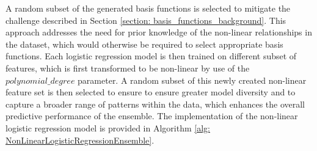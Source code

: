 \documentclass[10pt, conference]{IEEEtran}
\begin{document}
A random subset of the generated basis functions is selected to mitigate the challenge
described in Section \ref{section: basis_functions_background}. This approach addresses the need
for prior knowledge of the non-linear relationships in the dataset, which would otherwise be required to
select appropriate basis functions. Each logistic regression model is then trained on different subset
of features, which is first transformed to be non-linear by use of the $polynomial\_degree$ parameter.
A random subset of this newly created non-linear feature set is then selected to ensure to ensure greater
model diversity and to capture a broader range of patterns within the data, which enhances the overall predictive
performance of the ensemble.
The implementation of the non-linear logistic regression model is provided in Algorithm \ref{alg: NonLinearLogisticRegressionEnsemble}.
\end{document}

